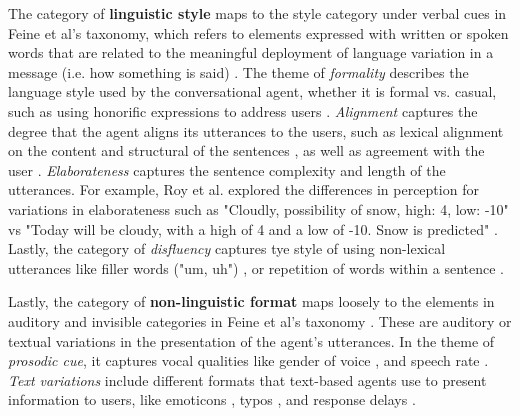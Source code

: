 \documentclass[sigconf,screen,review, anonymous]{acmart}
\newcommand{\cmt}[1]{}%
\begin{document}
The category of \textbf{linguistic style} maps to the style category under verbal cues in Feine et al's taxonomy, which refers to elements expressed with written or spoken words that are related to the meaningful deployment of language variation in a message (i.e. how something is said) \cite{feine2019taxonomy}. The theme of \textit{formality} describes the language style used by the conversational agent, whether it is formal vs. casual, such as using honorific expressions to address users \cite{ouchi2019should}\cmt{[59]}. \textit{Alignment} captures the degree that the agent aligns its utterances to the users, such as lexical alignment on the content and structural of the sentences \cite{huiyang2022improving}\cmt{[17]}\cite{linnemann2018can}\cmt{[15]}, as well as agreement with the user \cite{volkel2021examining}\cmt{[69]}. \textit{Elaborateness} captures the sentence complexity and length of the utterances. For example, Roy et al. explored the differences in perception for variations in elaborateness such as "Cloudly, possibility of snow, high: 4, low: -10" vs "Today will be cloudy, with a high of 4 and a low of -10. Snow is predicted" \cite{roy2021users}\cmt{[71]}. Lastly, the category of \textit{disfluency} captures tye style of using non-lexical utterances like filler words ("um, uh") \cite{hu2021enhancing}\cmt{[56]}\cite{jeong2019exploring}\cmt{[10]}, or repetition of words within a sentence \cite{yang2021effect}\cmt{[72]}. 

Lastly, the category of \textbf{non-linguistic format} maps loosely to the elements in auditory and invisible categories in Feine et al's taxonomy \cite{feine2019taxonomy}. These are auditory or textual variations in the presentation of the agent's utterances. In the theme of \textit{prosodic cue}, it captures vocal qualities like gender of voice \cite{habler2019effects}\cmt{[63]}\cite{jestin2022effects}\cmt{[81]}, and speech rate \cite{choi2020nobody}\cmt{[54]}. \textit{Text variations} include different formats that text-based agents use to present information to users, like emoticons \cite{kim2019comparing}\cmt{[89]}\cite{wilhelm2022keep}\cmt{[28]}, typos \cite{westerman2019believe}\cmt{[9]}, and response delays \cite{gnewuch2022opposing}\cmt{[20]}\cite{seeger2021chatbots}\cmt{[35]}.
\end{document}
